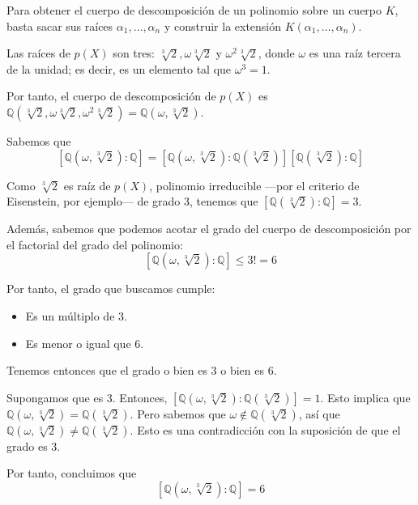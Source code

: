 \documentclass[a4paper, 11pt]{article}
\begin{document}
  \begin{solucion}
      Para obtener el cuerpo de descomposición de un polinomio sobre un cuerpo $K$, basta sacar sus raíces $\alpha_1,\dots,\alpha_n$ y construir la extensión $K(\alpha_1,\dots,\alpha_n)$.

      Las raíces de $p(X)$ son tres: $\sqrt[3]{2},\omega\sqrt[3]{2}$ y $\omega^2\sqrt[3]{2}$, donde $\omega$ es una raíz tercera de la unidad; es decir, es un elemento tal que $\omega^3=1$.

      Por tanto, el cuerpo de descomposición de $p(X)$ es $\mathbb{Q}(\sqrt[3]{2},\omega\sqrt[3]{2},\omega^2\sqrt[3]{2})=\mathbb{Q}(\omega,\sqrt[3]{2})$.

      Sabemos que
      \[
      [\mathbb{Q}(\omega,\sqrt[3]{2}):\mathbb{Q}] = [\mathbb{Q}(\omega,\sqrt[3]{2}):\mathbb{Q}(\sqrt[3]{2})][\mathbb{Q}(\sqrt[3]{2}):\mathbb{Q}]
      \]

      Como $\sqrt[3]{2}$ es raíz de $p(X)$, polinomio irreducible ---por el criterio de Eisenstein, por ejemplo--- de grado 3, tenemos que $[\mathbb{Q}(\sqrt[3]{2}):\mathbb{Q}] = 3$.

      Además, sabemos que podemos acotar el grado del cuerpo de descomposición por el factorial del grado del polinomio:
      \[
      [\mathbb{Q}(\omega,\sqrt[3]{2}):\mathbb{Q}] \leq 3! = 6
      \]

      Por tanto, el grado que buscamos cumple:
      \begin{itemize}
          \item Es un múltiplo de 3.
          \item Es menor o igual que 6.
      \end{itemize}

      Tenemos entonces que el grado o bien es 3 o bien es 6.

      Supongamos que es 3. Entonces, $[\mathbb{Q}(\omega,\sqrt[3]{2}):\mathbb{Q}(\sqrt[3]{2})] = 1$. Esto implica que  $\mathbb{Q}(\omega,\sqrt[3]{2}) = \mathbb{Q}(\sqrt[3]{2})$. Pero sabemos que $\omega\notin\mathbb{Q}(\sqrt[3]{2})$, así que $\mathbb{Q}(\omega,\sqrt[3]{2}) \neq \mathbb{Q}(\sqrt[3]{2})$. Esto es una contradicción con la suposición de que el grado es 3.

      Por tanto, concluimos que
      \[
      [\mathbb{Q}(\omega,\sqrt[3]{2}):\mathbb{Q}] = 6
      \]
  \end{solucion}

  \begin{apartado}
  \end{apartado}
\end{document}
